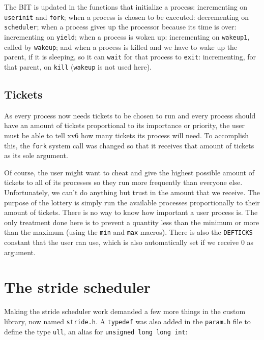 \documentclass[12pt]{article}
\begin{document}
The BIT is updated in the functions that initialize a process: incrementing on \texttt{userinit} and \texttt{fork}; when a process is chosen to be executed: decrementing on \texttt{scheduler}; when a process gives up the processor because its time is over: incrementing on \texttt{yield}; when a process is woken up: incrementing on \texttt{wakeup1}, called by \texttt{wakeup}; and when a process is killed and we have to wake up the parent, if it is sleeping, so it can \texttt{wait} for that process to \texttt{exit}: incrementing, for that parent, on \texttt{kill} (\texttt{wakeup} is not used here).

\subsection{Tickets}
As every process now needs tickets to be chosen to run and every process should have an amount of tickets proportional to its importance or priority, the user must be able to tell xv6 how many tickets its process will need. To accomplish this, the \texttt{fork} system call was changed so that it receives that amount of tickets as its sole argument.

Of course, the user might want to cheat and give the highest possible amount of tickets to all of its processes so they run more frequently than everyone else. Unfortunately, we can't do anything but trust in the amount that we receive. The purpose of the lottery is simply run the available processes proportionally to their amount of tickets. There is no way to know how important a user process is. The only treatment done here is to prevent a quantity less than the minimum or more than the maximum (using the \texttt{min} and \texttt{max} macros). There is also the \texttt{DEFTICKS} constant that the user can use, which is also automatically set if we receive 0 as argument.

\section{The stride scheduler}\label{sec:strsched}
Making the stride scheduler work demanded a few more things in the custom library, now named \texttt{stride.h}. A \texttt{typedef} was also added in the \texttt{param.h} file to define the type \texttt{ull}, an alias for \texttt{unsigned long long int}:
\end{document}
